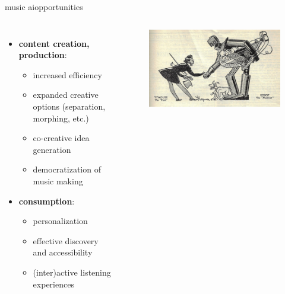 \begin{frame}{music ai}{opportunities}

    \begin{columns}
        \begin{itemize}
        \item \textbf{content creation, production}:
                \begin{itemize}
                \item increased efficiency
                \item expanded creative options (separation, morphing, etc.)
                \item co-creative idea generation
                \item democratization of music making
                \end{itemize}
        \bigskip
            \item \textbf{consumption}:
                \begin{itemize}
                    \item personalization
                    \item effective discovery and accessibility
                    \item (inter)active listening experiences
                \end{itemize}
        \end{itemize}
        \begin{figure}
            \vspace{13mm}
            \includegraphics[scale=.7]{graph/musical-robots}
        \end{figure}
    \end{columns}

\end{frame}


